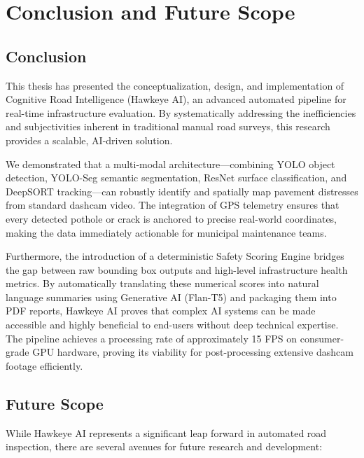 \chapter{Conclusion and Future Scope}
\label{chap:conclusion}

\section{Conclusion}
This thesis has presented the conceptualization, design, and implementation of Cognitive Road Intelligence (Hawkeye AI), an advanced automated pipeline for real-time infrastructure evaluation. By systematically addressing the inefficiencies and subjectivities inherent in traditional manual road surveys, this research provides a scalable, AI-driven solution.

We demonstrated that a multi-modal architecture—combining YOLO object detection, YOLO-Seg semantic segmentation, ResNet surface classification, and DeepSORT tracking—can robustly identify and spatially map pavement distresses from standard dashcam video. The integration of GPS telemetry ensures that every detected pothole or crack is anchored to precise real-world coordinates, making the data immediately actionable for municipal maintenance teams. 

Furthermore, the introduction of a deterministic Safety Scoring Engine bridges the gap between raw bounding box outputs and high-level infrastructure health metrics. By automatically translating these numerical scores into natural language summaries using Generative AI (Flan-T5) and packaging them into PDF reports, Hawkeye AI proves that complex AI systems can be made accessible and highly beneficial to end-users without deep technical expertise. The pipeline achieves a processing rate of approximately 15 FPS on consumer-grade GPU hardware, proving its viability for post-processing extensive dashcam footage efficiently.

\section{Future Scope}
While Hawkeye AI represents a significant leap forward in automated road inspection, there are several avenues for future research and development:

